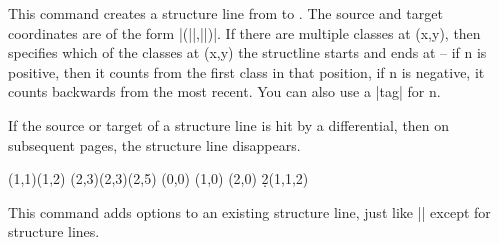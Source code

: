 \documentclass{ltxdoc}
\begin{document}
\begin{sseqdata}[name=ex1,degree={#1}{1-#1}]
\begin{command}{\structline{}}
This command creates a structure line from  to . The source and target coordinates are of the form |(||,||)|. If there are multiple classes at (x,y), then  specifies which of the classes at (x,y) the structline starts and ends at -- if n is positive, then it counts from the first class in that position, if n is negative, it counts backwards from the most recent. You can also use a |tag| for n.

If the source or target of a structure line is hit by a differential, then on subsequent pages, the structure line disappears.
\begin{codeexample}[width=9cm]
\sseqnewgroup*{}
\begin{sseqdata}[name=structline example,
                 classes={circle,fill},
                 Adams grading, no axes]
\class(1,1)\class(1,2)
\class(2,3)\class(2,3)\class(2,5)
\tower[classes=blue](0,0)
\tower[struct lines=dashed,orange](1,0)
\tower[struct lines=red](2,0)
\d2(1,1,2)
\end{sseqdata}
\printpage[name=structline example,page=2]
\hskip1cm
\printpage[name=structline example,page=3]
\end{codeexample}
\end{command}

\begin{command}{}
This command adds options to an existing structure line, just like |\classoptions| except for structure lines.
\end{command}


\end{sseqdata}
\end{document}
